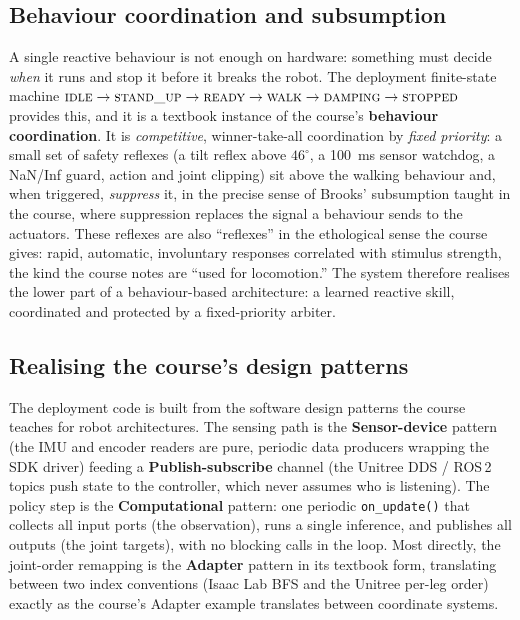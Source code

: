 \documentclass[conference]{IEEEtran}
\begin{document}
\subsection{Behaviour coordination and subsumption}
A single reactive behaviour is not enough on hardware: something must decide \emph{when} it runs
and stop it before it breaks the robot. The deployment finite-state machine
$\textsc{idle}\to\textsc{stand\_up}\to\textsc{ready}\to\textsc{walk}\to\textsc{damping}\to
\textsc{stopped}$ provides this, and it is a textbook instance of the course's \textbf{behaviour
coordination}. It is \emph{competitive}, winner-take-all coordination by \emph{fixed priority}: a
small set of safety reflexes (a tilt reflex above $46^\circ$, a 100~ms sensor watchdog, a NaN/Inf
guard, action and joint clipping) sit above the walking behaviour and, when triggered,
\emph{suppress} it, in the precise sense of Brooks' subsumption taught in the course, where
suppression replaces the signal a behaviour sends to the actuators. These reflexes are also
``reflexes'' in the ethological sense the course gives: rapid, automatic, involuntary responses
correlated with stimulus strength, the kind the course notes are ``used for locomotion.'' The
system therefore realises the lower part of a behaviour-based architecture: a learned reactive
skill, coordinated and protected by a fixed-priority arbiter.

\subsection{Realising the course's design patterns}
The deployment code is built from the software design patterns the course teaches for robot
architectures. The sensing path is the \textbf{Sensor-device} pattern (the IMU and encoder
readers are pure, periodic data producers wrapping the SDK driver) feeding a
\textbf{Publish-subscribe} channel (the Unitree DDS / ROS\,2 topics push state to the controller,
which never assumes who is listening). The policy step is the \textbf{Computational} pattern: one
periodic \texttt{on\_update()} that collects all input ports (the observation), runs a single
inference, and publishes all outputs (the joint targets), with no blocking calls in the loop.
Most directly, the joint-order remapping is the \textbf{Adapter} pattern in its textbook form,
translating between two index conventions (Isaac Lab BFS and the Unitree per-leg order) exactly as
the course's Adapter example translates between coordinate systems.
\end{document}

